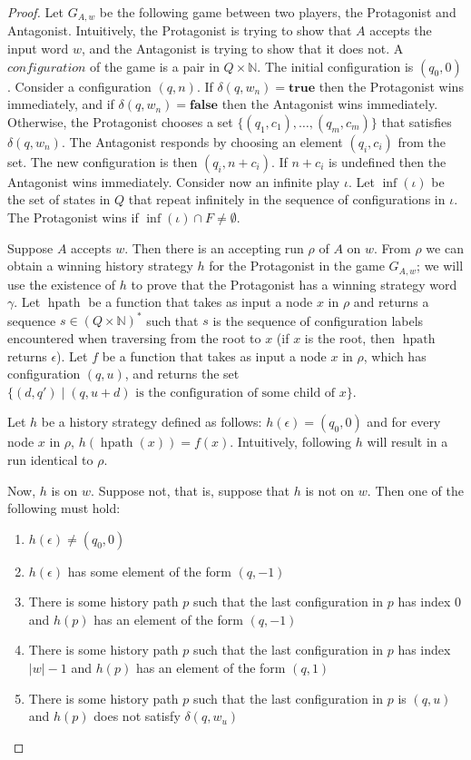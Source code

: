\documentclass{lmcs}
\theoremstyle{definition}
\DeclareMathOperator{\?}{?}
\DeclareMathOperator{\mypath}{hpath}
\begin{document}
\begin{proof}


    Let $G_{A,w}$ be the following game between two players, the Protagonist and Antagonist.
    Intuitively, the Protagonist is trying to show that $A$ accepts the input word $w$, and the Antagonist is trying
    to show that it does not. A $\textit{configuration}$ of the game is a pair in $Q \times \mathbb{N}$. The initial configuration is
    $(q_0, 0)$. Consider a configuration $(q,n)$. If $\delta(q,w_n) = \textbf{true}$ then the Protagonist wins immediately, and if
    $\delta(q,w_n) = \textbf{false}$ then the Antagonist wins immediately.
    Otherwise, the Protagonist chooses a set $\{(q_1,c_1), \ldots, (q_m,c_m)\}$ that
    satisfies $\delta(q, w_n)$. The Antagonist responds by choosing an element $(q_i, c_i)$ from the set. The new configuration is then
    $(q_i, n + c_i)$. If $n + c_i$ is undefined then the Antagonist wins immediately.
    Consider now an infinite play $\iota$. Let $\inf(\iota)$ be the set of states in $Q$ that repeat infinitely
    in the sequence of configurations in $\iota$. The Protagonist wins if $\inf(\iota) \cap F \neq \emptyset$.



    Suppose $A$ accepts $w$. Then there is an accepting run $\rho$ of $A$ on $w$. From $\rho$ we can obtain a winning history
    strategy $h$ for the Protagonist in the game $G_{A,w}$; we will use the existence of $h$ to prove that the Protagonist
    has a winning strategy word $\gamma$.
    Let $\mypath$ be a function that takes as input a node $x$ in $\rho$ and returns a sequence
    $s \in (Q \times \mathbb{N})^*$ such that $s$ is the sequence of configuration labels encountered when traversing from the
    root to $x$ (if $x$ is the root, then $\mypath$ returns $\epsilon$). Let $f$ be a function that takes as input
    a node $x$ in $\rho$, which has configuration $(q,u)$, and returns the set $\{(d,q') \mid (q, u+d) \text{ is the
    configuration of some child of } x \}$.

    Let $h$ be a history strategy defined as follows: $h(\epsilon) = (q_0,0)$ and for every node $x$ in $\rho$, $h(\mypath(x)) = f(x)$. Intuitively, following $h$ will result in a run identical to $\rho$.


    Now, $h$ is on $w$. Suppose not, that is, suppose that $h$ is not on $w$. Then one of the following must hold:
    \begin{enumerate}
        \item $h(\epsilon) \neq (q_0,0)$
        \item $h(\epsilon)$ has some element of the form $(q, -1)$
        \item There is some history path $p$ such that the last configuration in $p$ has index 0 and $h(p)$ has an element of the form $(q,-1)$
        \item There is some history path $p$ such that the last configuration in $p$ has index $|w| - 1$ and $h(p)$ has an element of the form $(q,1)$
        \item There is some history path $p$ such that the last configuration in $p$ is $(q,u)$ and $h(p)$ does not satisfy $\delta(q,w_u)$
    \end{enumerate}


\end{proof}
\end{document}
